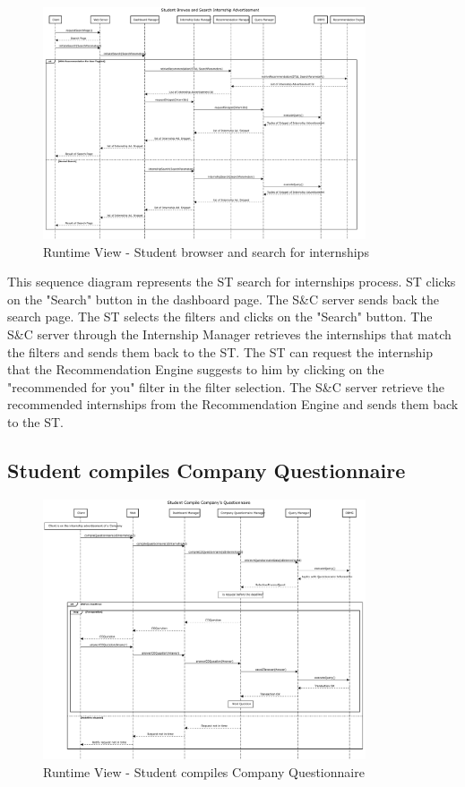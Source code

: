 \begin{figure}[H]
      \centering
      \includegraphics[width=0.85\textwidth]{Images/RV_03.pdf}
      \caption{Runtime View - Student browser and search for internships}
      \label{fig:rv-student-browser-and-search-for-internships}
\end{figure}

\par This sequence diagram represents the ST search for internships process. ST clicks on the "Search" button in the dashboard
page. The S\&C server sends back the search page. The ST selects the filters and clicks on the "Search" button. The S\&C server
through the Internship Manager retrieves the internships that match the filters and sends them back to the ST. The ST can
request the internship that the Recommendation Engine suggests to him by clicking on the "recommended for you" filter in the
filter selection. The S\&C server retrieve the recommended internships from the Recommendation Engine and sends them back to the ST.

\subsection{Student compiles Company Questionnaire}

\begin{figure}[H]
      \centering
      \includegraphics[width=0.85\textwidth]{Images/RV_04a.pdf}
      \caption{Runtime View - Student compiles Company Questionnaire}
      \label{fig:rv-student-compiles-company-questionnaire}
\end{figure}


